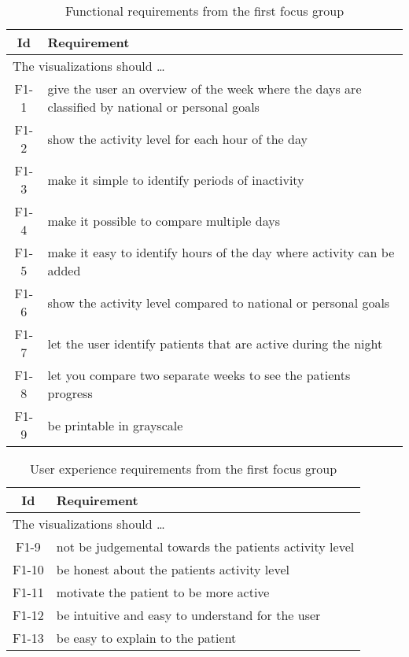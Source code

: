 \begin{table}[h!]
  \begin{center}
  \begin{tabular}{|c|p{12cm}|}
    \hline
      \textbf{Id} & \textbf{Requirement} \\ \hline
    \multicolumn{2}{|l|}{The visualizations should \ldots} \\ \hline
      F1-1 & give the user an overview of the week where the days are classified by national or personal goals \\ \hline
      F1-2 & show the activity level for each hour of the day \\ \hline
      F1-3 & make it simple to identify periods of inactivity \\ \hline
      F1-4 & make it possible to compare multiple days \\ \hline
      F1-5 & make it easy to identify hours of the day where activity can be added \\ \hline
      F1-6 & show the activity level compared to national or personal goals \\ \hline
      F1-7 & let the user identify patients that are active during the night \\ \hline
      F1-8 & let you compare two separate weeks to see the patients progress \\ \hline
      F1-9 & be printable in grayscale \\ \hline
  \end{tabular}
  \end{center}
  \caption{Functional requirements from the first focus group}
\end{table}

\begin{table}[h!]
  \begin{center}
  \begin{tabular}{|c|p{12cm}|}
    \hline
      \textbf{Id} & \textbf{Requirement} \\ \hline
    \multicolumn{2}{|l|}{The visualizations should \ldots} \\ \hline
      F1-9 & not be judgemental towards the patients activity level \\ \hline
      F1-10 & be honest about the patients activity level \\ \hline
      F1-11 & motivate the patient to be more active \\ \hline
      F1-12 & be intuitive and easy to understand for the user \\ \hline
      F1-13 & be easy to explain to the patient
  \end{tabular}
  \end{center}
  \caption{User experience requirements from the first focus group}
\end{table}
